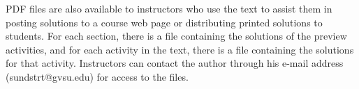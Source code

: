 
PDF files are also available to instructors who use the text to assist them in posting solutions to a course web page or distributing printed solutions to students.  For each section, there is a file containing the solutions of the preview activities, and for each activity in the text, there is a file containing the solutions for that activity.  Instructors can contact the author through his e-mail address (sundstrt@gvsu.edu) for access to the files.



